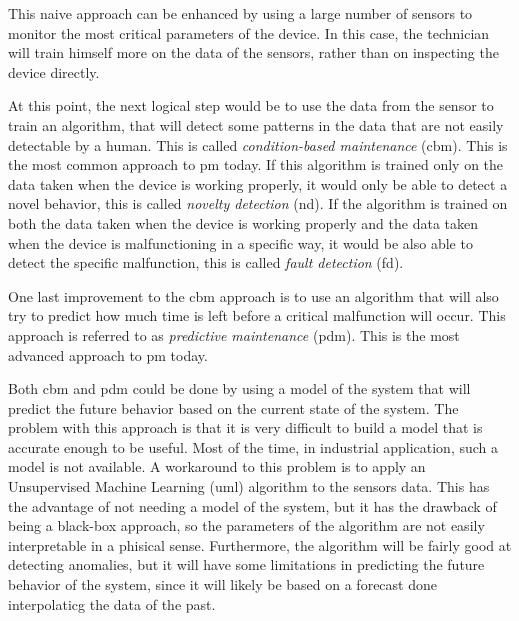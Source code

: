 This naive approach can be enhanced by using a large number of sensors to monitor the most critical parameters of the device. In this case, the technician will train himself more on the data of the sensors, rather than on inspecting the device directly. 

At this point, the next logical step would be to use the data from the sensor to train an algorithm, that will detect some patterns in the data that are not easily detectable by a human. This is called \emph{condition-based maintenance} (\gls{cbm}). This is the most common approach to \gls{pm} today. If this algorithm is trained only on the data taken when the device is working properly, it would only be able to detect a novel behavior, this is called \emph{novelty detection} (\gls{nd}). If the algorithm is trained on both the data taken when the device is working properly and the data taken when the device is malfunctioning in a specific way, it would be also able to detect the specific malfunction, this is called \emph{fault detection} (\gls{fd}).

One last improvement to the \gls{cbm} approach is to use an algorithm that will also try to predict how much time is left before a critical malfunction will occur. This approach is referred to as \emph{predictive maintenance} (\gls{pdm}). This is the most advanced approach to \gls{pm} today.

Both \gls{cbm} and \gls{pdm} could be done by using a model of the system that will predict the future behavior based on the current state of the system. The problem with this approach is that it is very difficult to build a model that is accurate enough to be useful. Most of the time, in industrial application, such a model is not available.
A workaround to this problem is to apply an Unsupervised Machine Learning (\gls{uml}) algorithm to the sensors data. This has the advantage of not needing a model of the system, but it has the drawback of being a black-box approach, so the parameters of the algorithm are not easily interpretable in a phisical sense. Furthermore, the algorithm will be fairly good at detecting anomalies, but it will have some limitations in predicting the future behavior of the system, since it will likely be based on a forecast done interpolaticg the data of the past.

